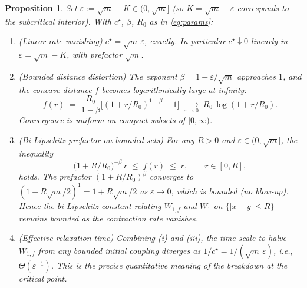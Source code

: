 \documentclass[11pt]{article}
\newtheorem{proposition}[theorem]{Proposition}
\theoremstyle{definition}
\begin{document}
\begin{proposition}\label{prop:critical}
Set $\varepsilon := \sqrt m - K \in (0, \sqrt m]$ (so $K = \sqrt m - \varepsilon$ corresponds to the subcritical interior). With $c^\star$, $\beta$, $R_0$ as in \eqref{eq:params}:
\begin{enumerate}
  \item[(i)] (Linear rate vanishing) $c^\star = \sqrt m\,\varepsilon$, exactly. In particular $c^\star \downarrow 0$ \emph{linearly} in $\varepsilon = \sqrt m - K$, with prefactor $\sqrt m$.
  \item[(ii)] (Bounded distance distortion) The exponent $\beta = 1 - \varepsilon/\sqrt m$ approaches $1$, and the concave distance $f$ becomes \emph{logarithmically} large at infinity:
  \[
  f(r) \;=\; \frac{R_0}{1 - \beta}\bigl[(1 + r/R_0)^{1-\beta} - 1\bigr] \;\xrightarrow[\varepsilon \to 0]{}\; R_0\,\log(1 + r/R_0).
  \]
  Convergence is uniform on compact subsets of $[0, \infty)$.
  \item[(iii)] (Bi-Lipschitz prefactor on bounded sets) For any $R > 0$ and $\varepsilon \in (0, \sqrt m]$, the inequality
  \[
  \bigl(1 + R/R_0\bigr)^{-\beta}\,r \;\le\; f(r) \;\le\; r, \qquad r \in [0, R],
  \]
  holds. The prefactor $(1 + R/R_0)^{\beta}$ converges to $(1 + R\sqrt m/2)^1 = 1 + R\sqrt m/2$ as $\varepsilon \to 0$, which is \emph{bounded} (no blow-up). Hence the bi-Lipschitz constant relating $W_{1,f}$ and $W_1$ on $\{|x-y| \le R\}$ remains bounded as the contraction rate vanishes.
  \item[(iv)] (Effective relaxation time) Combining (i) and (iii), the time scale to halve $W_{1,f}$ from any bounded initial coupling diverges as $1/c^\star = 1/(\sqrt m\,\varepsilon)$, i.e., $\Theta(\varepsilon^{-1})$. This is the precise quantitative meaning of the breakdown at the critical point.
\end{enumerate}
\end{proposition}
\end{document}
